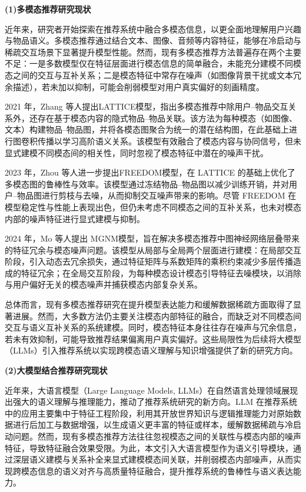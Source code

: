 \textbf{(1)多模态推荐研究现状}

近年来，研究者开始探索在推荐系统中融合多模态信息，以更全面地理解用户兴趣与物品语义。多模态推荐通过结合文本、图像、音频等内容特征，能够在冷启动与稀疏交互场景下显著提升模型性能。然而，现有多模态推荐方法普遍存在两个主要不足：一是多数模型仅在特征层面进行模态信息的简单融合，未能充分建模不同模态之间的交互与互补关系；二是模态特征中常存在噪声（如图像背景干扰或文本冗余描述），若未加以抑制，可能会削弱模型对用户真实偏好的刻画精度。

2021 年，Zhang 等人提出LATTICE模型\cite{zhang2021mining}，指出多模态推荐中除用户–物品交互关系外，还存在基于模态内容的隐式物品–物品关联。该方法为每种模态（如图像、文本）构建物品–物品图，并将各模态图聚合为统一的潜在结构图，在此基础上进行图卷积传播以学习高阶语义关系。该模型有效融合了模态内容与协同信号，但未显式建模不同模态间的相关性，同时忽视了模态特征中潜在的噪声干扰。

2023 年，Zhou 等人进一步提出FREEDOM模型\cite{zhou2023tale}，在 LATTICE 的基础上优化了多模态图的鲁棒性与效率。该模型通过冻结物品–物品图以减少训练开销，并对用户–物品图进行剪枝与去噪，从而抑制交互噪声带来的影响。尽管 FREEDOM 在模型稳定性与性能上表现出色，但仍未考虑不同模态之间的互补关系，也未对模态内部的噪声特征进行显式建模与抑制。

2024 年，Mo 等人提出 MGNM模型\cite{mo2024multimodal}，旨在解决多模态推荐中图神经网络层叠带来的特征冗余与模态噪声问题。该模型从局部与全局两个层面进行建模：在局部交互阶段，引入动态去冗余损失，通过特征矩阵与系数矩阵的乘积约束减少多层传播造成的特征冗余；在全局交互阶段，为每种模态设计模态引导特征去噪模块，以消除与用户偏好无关的模态噪声并捕获模态内部复杂关系。

总体而言，现有多模态推荐研究在提升模型表达能力和缓解数据稀疏方面取得了显著进展。然而，大多数方法仍主要关注模态内部特征的融合，而缺乏对不同模态间交互与语义互补关系的系统建模。同时，模态特征本身往往存在噪声与冗余信息，若未有效抑制，可能导致推荐结果偏离用户真实偏好。这些局限性为后续将大模型（LLMs）引入推荐系统以实现跨模态语义理解与知识增强提供了新的研究方向。

\textbf{(2)大模型结合推荐研究现状}

近年来，大语言模型（Large Language Models, LLMs）在自然语言处理领域展现出强大的语义理解与推理能力，推动了推荐系统研究的新方向。LLM 在推荐系统中的应用主要集中于特征工程阶段，利用其开放世界知识与逻辑推理能力对原始数据进行后加工与数据增强，以生成语义更丰富的特征或样本，缓解数据稀疏与冷启动问题。然而，现有多模态推荐方法往往忽视模态之间的关联性与模态内部的噪声特征，导致特征融合效果受限。为此，本文引入大语言模型作为语义引导模块，通过深层语义建模与关系补全来显式建模模态间关联，并削弱模态内部噪声，从而实现跨模态信息的语义对齐与高质量特征融合，提升推荐系统的鲁棒性与语义表达能力。

